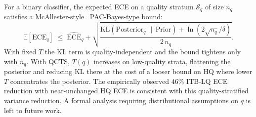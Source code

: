 \documentclass{bmvc2k}
\newcommand{\qbar}{\bar{q}}
\newcommand{\E}{\mathbb{E}}
\begin{document}
For a binary classifier, the expected ECE on a quality stratum $\mathcal{S}_q$ of size $n_q$ satisfies a McAllester-style~\cite{mcallester1999pac} PAC-Bayes-type bound:
\begin{equation}
\E[\mathrm{ECE}_q] \;\leq\; \widehat{\mathrm{ECE}}_q + \sqrt{\frac{\mathrm{KL}(\mathrm{Posterior}_q \,\|\, \mathrm{Prior}) + \ln(2\sqrt{n_q}/\delta)}{2\,n_q}}.
\label{eq:pac_bayes}
\end{equation}
With fixed $T$ the KL term is quality-independent and the bound tightens only with $n_q$. With QCTS, $T(\qbar)$ increases on low-quality strata, flattening the posterior and reducing KL there at the cost of a looser bound on HQ where lower $T$ concentrates the posterior. The empirically observed $46\%$ ITB-LQ ECE reduction with near-unchanged HQ ECE is consistent with this quality-stratified variance reduction. A formal analysis requiring distributional assumptions on $\qbar$ is left to future work.


{\small

}
\end{document}
